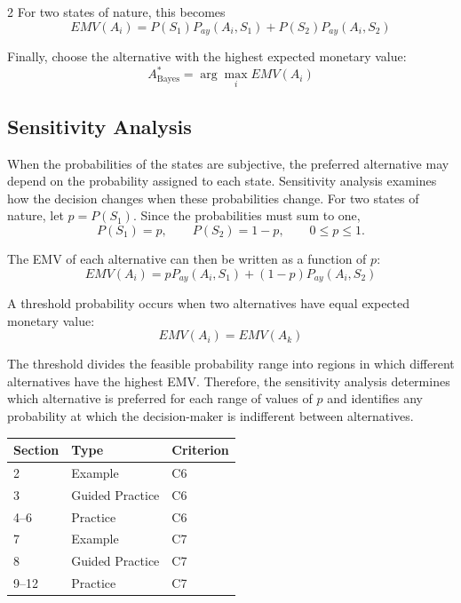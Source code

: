 \begin{multicols}{2}
	For two states of nature, this becomes
	$$
	\boxed{
		EMV(A_i)
		=
		P(S_1)P_{ay}(A_i,S_1)
		+
		P(S_2)P_{ay}(A_i,S_2)
	}
	$$
	
	Finally, choose the alternative with the highest expected monetary
	value:
	$$
	\boxed{
		A^*_{\mathrm{Bayes}}
		=
		\arg\max_i EMV(A_i)
	}
	$$
	
	\subsection*{Sensitivity Analysis}
	
	When the probabilities of the states are subjective, the preferred
	alternative may depend on the probability assigned to each state.
	Sensitivity analysis examines how the decision changes when these
	probabilities change.
	For two states of nature, let $p=P(S_1)$. Since the probabilities must
	sum to one,
	$$
	P(S_1)=p,
	\qquad
	P(S_2)=1-p,
	\qquad
	0\leq p\leq1.
	$$
	
	The EMV of each alternative can then be written as a function of $p$:
	$$
	\boxed{
		EMV(A_i)
		=
		pP_{ay}(A_i,S_1)
		+
		(1-p)P_{ay}(A_i,S_2)
	}
	$$
	
	A threshold probability occurs when two alternatives have equal
	expected monetary value:
	$$
	\boxed{
		EMV(A_i)=EMV(A_k)
	}
	$$
	
	The threshold divides the feasible probability range into regions in
	which different alternatives have the highest EMV. Therefore, the
	sensitivity analysis determines which alternative is preferred for each
	range of values of $p$ and identifies any probability at which the
	decision-maker is indifferent between alternatives.
	
	\begin{center}
		\renewcommand{\arraystretch}{1.4}
		
		\begin{tabular}{p{}p{}p{}}
			\toprule
			\textbf{Section} & \textbf{Type} & \textbf{Criterion} \\
			\midrule
			2 & Example & C6 \\
			3 & Guided Practice & C6 \\
			4--6 & Practice & C6 \\
			\midrule
			7 & Example & C7 \\
			8 & Guided Practice & C7 \\
			9--12 & Practice & C7 \\
			\bottomrule
		\end{tabular}
	\end{center}
	

\end{multicols}
